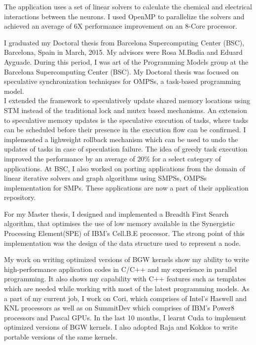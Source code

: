 \documentclass[10pt,stdletter,dateno]{newlfm}
\begin{document}
\begin{newlfm}
    The application uses a set of linear solvers to calculate the chemical and electrical interactions between the neurons.
    I used OpenMP to parallelize the solvers and achieved an average of 6X performance improvement on an 8-Core processor.
%
    \par
    I graduated my Doctoral thesis from Barcelona Supercomputing Center (BSC), Barcelona, Spain in March, 2015.
    My advisors were Rosa M.Badia and Eduard Ayguade.
    During this period, I was art of the Programming Models group at the Barcelona Supercomputing Center (BSC).
    My Doctoral thesis was focused on speculative synchronization techniques for OMPSs, a task-based programming model.\\
%
    I extended the framework to speculatively update shared memory locations using STM instead of the traditional lock and mutex based mechanisms.
    An extension to speculative memory updates is the speculative execution of tasks, where tasks can be scheduled before their presence in the execution flow can be confirmed.
    I implemented a lighweight rollback mechanism which can be used to undo the updates of tasks in case of speculation failure.
    The idea of greedy task execution improved the performance by an average of 20\% for a select category of applications.
    At BSC, I also worked on porting applications from the domain of linear iterative solvers and graph algorithms using SMPSs, OMPSs implementation for SMPs.
    These applications are now a part of their application repository.
%
    \par
    For my Master thesis, I designed and implemented a Breadth First Search algorithm, that optimises the use of low memory available in the Synergistic Processing Element(SPE) of IBM's Cell.B.E processor.
    The strong point of this implementation was the design of the data structure used to represent a node.
%
	\par
    My work on writing optimized versions of BGW kernels show my ability to write high-performance application codes in C/C++ and my experience in parallel programming.
    It also shows my capability with C++ features such as templates which are needed while working with most of the latest programming models.
    As a part of my current job, I work on Cori, which comprises of Intel's Haswell and KNL processors as well as on SummitDev which comprises of IBM's Power8 processors and Pascal GPUs.
    In the last 10 months, I learnt Cuda to implement optimized versions of BGW kernels. I also adopted Raja and Kokkos to write portable versions of the same kernels.

\end{newlfm}
\end{document}
